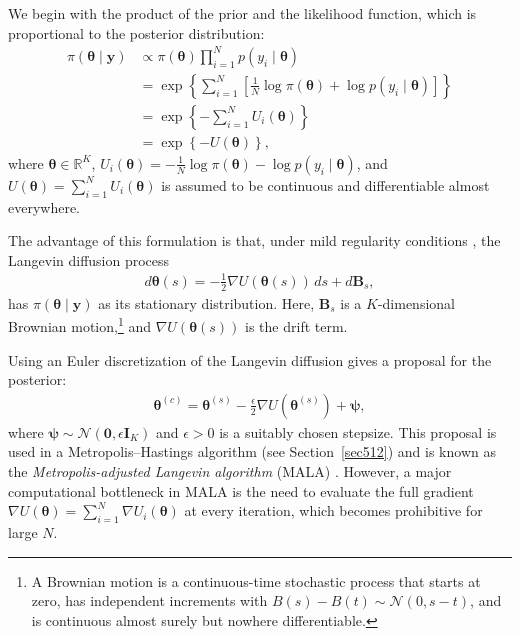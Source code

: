 We begin with the product of the prior and the likelihood function, which is proportional to the posterior distribution:
\begin{align*}
	\pi(\boldsymbol{\theta} \mid \mathbf{y}) &\propto \pi(\boldsymbol{\theta}) \prod_{i=1}^{N} p(y_i \mid \boldsymbol{\theta}) \\
	&= \exp\left\{ \sum_{i=1}^N \left[ \frac{1}{N} \log \pi(\boldsymbol{\theta}) + \log p(y_i \mid \boldsymbol{\theta}) \right] \right\} \\
	&= \exp\left\{ -\sum_{i=1}^N U_i(\boldsymbol{\theta}) \right\} \\
	&= \exp\left\{ -U(\boldsymbol{\theta}) \right\},
\end{align*}
where \( \boldsymbol{\theta} \in \mathbb{R}^K \), \( U_i(\boldsymbol{\theta}) = -\frac{1}{N} \log \pi(\boldsymbol{\theta}) - \log p(y_i \mid \boldsymbol{\theta}) \), and \( U(\boldsymbol{\theta}) = \sum_{i=1}^N U_i(\boldsymbol{\theta}) \) is assumed to be continuous and differentiable almost everywhere.

The advantage of this formulation is that, under mild regularity conditions \cite{roberts1996exponential}, the Langevin diffusion process
\begin{align*}
	d\boldsymbol{\theta}(s) = -\frac{1}{2} \nabla U(\boldsymbol{\theta}(s))\,ds + d\mathbf{B}_s,
\end{align*}
has \( \pi(\boldsymbol{\theta} \mid \mathbf{y}) \) as its stationary distribution. Here, \( \mathbf{B}_s \) is a \( K \)-dimensional Brownian motion,\footnote{A Brownian motion is a continuous-time stochastic process that starts at zero, has independent increments with \( B(s) - B(t) \sim \mathcal{N}(0, s - t) \), and is continuous almost surely but nowhere differentiable.} and \( \nabla U(\boldsymbol{\theta}(s)) \) is the drift term.

Using an Euler discretization of the Langevin diffusion gives a proposal for the posterior:
\begin{align*}
	\boldsymbol{\theta}^{(c)} = \boldsymbol{\theta}^{(s)} - \frac{\epsilon}{2} \nabla U(\boldsymbol{\theta}^{(s)}) + \boldsymbol{\psi},
\end{align*}
where \( \boldsymbol{\psi} \sim \mathcal{N}(\mathbf{0}, \epsilon \mathbf{I}_K) \) and \( \epsilon > 0 \) is a suitably chosen stepsize. This proposal is used in a Metropolis–Hastings algorithm (see Section~\ref{sec512}) and is known as the \textit{Metropolis-adjusted Langevin algorithm} (MALA) \cite{roberts1996exponential}. However, a major computational bottleneck in MALA is the need to evaluate the full gradient \( \nabla U(\boldsymbol{\theta}) = \sum_{i=1}^N \nabla U_i(\boldsymbol{\theta}) \) at every iteration, which becomes prohibitive for large \( N \).

